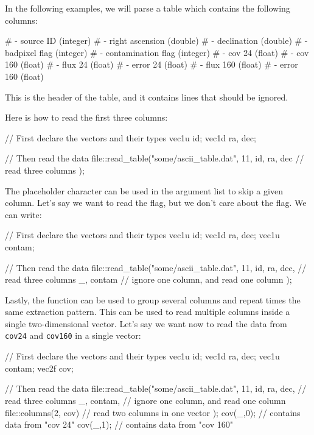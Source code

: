 In the following examples, we will parse a table which contains the following columns:
\begin{bashcode}
#  - source ID              (integer)
#  - right ascension        (double)
#  - declination            (double)
#  - badpixel flag          (integer)
#  - contamination flag     (integer)
#  - cov   24               (float)
#  - cov   160              (float)
#  - flux  24               (float)
#  - error 24               (float)
#  - flux  160              (float)
#  - error 160              (float)
\end{bashcode}
This is the header of the table, and it contains  lines that should be ignored.

Here is how to read the first three columns:
\begin{cppcode}
// First declare the vectors and their types
vec1u id;
vec1d ra, dec;

// Then read the data
file::read_table("some/ascii_table.dat", 11,
    id, ra, dec // read three columns
);
\end{cppcode}

The placeholder character \cppinline{_} can be used in the argument list to skip a given column. Let's say we want to read the  flag, but we don't care about the  flag. We can write:
\begin{cppcode}
// First declare the vectors and their types
vec1u id;
vec1d ra, dec;
vec1u contam;

// Then read the data
file::read_table("some/ascii_table.dat", 11,
    id, ra, dec, // read three columns
    _, contam    // ignore one column, and read one column
);
\end{cppcode}

Lastly, the  function can be used to group several columns and repeat  times the same extraction pattern. This can be used to read multiple columns inside a single two-dimensional vector. Let's say we want now to read the data from \texttt{cov24} and \texttt{cov160} in a single vector:
\begin{cppcode}
// First declare the vectors and their types
vec1u id;
vec1d ra, dec;
vec1u contam;
vec2f cov;

// Then read the data
file::read_table("some/ascii_table.dat", 11,
    id, ra, dec, // read three columns
    _, contam,   // ignore one column, and read one column
    file::columns(2, cov) // read two columns in one vector
);
cov(_,0); // contains data from "cov 24"
cov(_,1); // contains data from "cov 160"
\end{cppcode}

